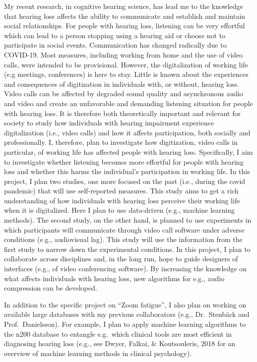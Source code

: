 \documentclass[]{article}
\begin{document}
My recent research, in cognitive hearing science, has lead me to the
knowledge that hearing loss affects the ability to communicate and
establish and maintain social relationships. For people with hearing
loss, listening can be very effortful which can lead to a person
stopping using a hearing aid or choose not to participate in social
events. Communication has changed radically due to COVID-19. Most
measures, including working from home and the use of video calls, were
intended to be provisional. However, the digitalization of working life
(e.g meetings, conferences) is here to stay. Little is known about the
experiences and consequences of digitization in individuals with, or
without, hearing loss. Video calls can be affected by degraded sound
quality and asynchronous audio and video and create an unfavorable and
demanding listening situation for people with hearing loss. It is
therefore both theoretically important and relevant for society to study
how individuals with hearing impairment experience digitalization (i.e.,
video calls) and how it affects participation, both socially and
professionally. I, therefore, plan to investigate how digitization,
video calls in particular, of working life has affected people with
hearing loss. Specifically, I aim to investigate whether listening
becomes more effortful for people with hearing loss and whether this
harms the individual's participation in working life. In this project, I
plan two studies, one more focused on the past (i.e., during the covid
pandemic) that will use self-reported measures. This study aims to get a
rich understanding of how individuals with hearing loss perceive their
working life when it is digitalized. Here I plan to use data-driven
(e.g., machine learning methods). The second study, on the other hand,
is planned to use experiments in which participants will communicate
through video call software under adverse conditions (e.g., audiovisual
lag). This study will use the information from the first study to narrow
down the experimental conditions. In this project, I plan to collaborate
across disciplines and, in the long run, hope to guide designers of
interfaces (e.g., of video conferencing software). By increasing the
knowledge on what affects individuals with hearing loss, new algorithms
for e.g., audio compression can be developed.

In addition to the specific project on ``Zoom fatigue'', I also plan on
working on available large databases with my previous collaborators
(e.g., Dr.~Stenbäck and Prof.~Danielsson). For example, I plan to apply
machine learning algorithms to the n200 database to entangle e.g.~which
clinical tools are most efficient in diagnosing hearing loss (e.g., see
Dwyer, Falkai, \& Koutsouleris, 2018 for an overview of machine learning
methods in clinical psychology).
\end{document}

